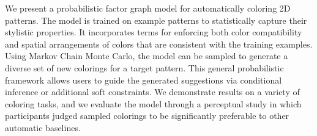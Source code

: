 We present a probabilistic factor graph model for automatically coloring 2D patterns. The model is trained on example patterns to statistically capture their stylistic properties. It incorporates terms for enforcing both color compatibility and spatial arrangements of colors that are consistent with the training examples. Using Markov Chain Monte Carlo, the model can be sampled to generate a diverse set of new colorings for a target pattern. This general probabilistic framework allows users to guide the generated suggestions via conditional inference or additional soft constraints. We demonstrate results on a variety of coloring tasks, and we evaluate the model through a perceptual study in which participants judged sampled colorings to be significantly preferable to other automatic baselines.